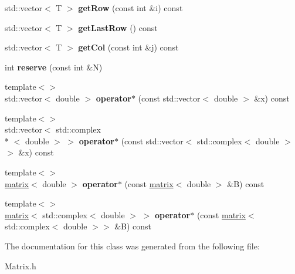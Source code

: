 \begin{DoxyCompactItemize}
\item 
\hypertarget{classkeycpp_1_1matrix_a14cad5ff7a9b3079754fc83b677208ed}{std\-::vector$<$ T $>$ {\bfseries get\-Row} (const int \&i) const }\label{classkeycpp_1_1matrix_a14cad5ff7a9b3079754fc83b677208ed}

\item 
\hypertarget{classkeycpp_1_1matrix_a20002e97217bcc6382e60694bf898e1f}{std\-::vector$<$ T $>$ {\bfseries get\-Last\-Row} () const }\label{classkeycpp_1_1matrix_a20002e97217bcc6382e60694bf898e1f}

\item 
\hypertarget{classkeycpp_1_1matrix_a9c16ead5c2a61eb35c33328caa235b2f}{std\-::vector$<$ T $>$ {\bfseries get\-Col} (const int \&j) const }\label{classkeycpp_1_1matrix_a9c16ead5c2a61eb35c33328caa235b2f}

\item 
\hypertarget{classkeycpp_1_1matrix_a719eb1cb62d0cd9168abe2235235f278}{int {\bfseries reserve} (const int \&N)}\label{classkeycpp_1_1matrix_a719eb1cb62d0cd9168abe2235235f278}

\item 
\hypertarget{classkeycpp_1_1matrix_a53aaf4f54bdbebf5664b67a440f73040}{{\footnotesize template$<$$>$ }\\std\-::vector$<$ double $>$ {\bfseries operator$\ast$} (const std\-::vector$<$ double $>$ \&x) const}\label{classkeycpp_1_1matrix_a53aaf4f54bdbebf5664b67a440f73040}

\item 
\hypertarget{classkeycpp_1_1matrix_a8a9131597beafc39a3d94b59af930756}{{\footnotesize template$<$$>$ }\\std\-::vector$<$ std\-::complex\\*
$<$ double $>$ $>$ {\bfseries operator$\ast$} (const std\-::vector$<$ std\-::complex$<$ double $>$$>$ \&x) const}\label{classkeycpp_1_1matrix_a8a9131597beafc39a3d94b59af930756}

\item 
\hypertarget{classkeycpp_1_1matrix_a0e9fdbebdf1d95dd225a2bd1310cba30}{{\footnotesize template$<$$>$ }\\\hyperlink{classkeycpp_1_1matrix}{matrix}$<$ double $>$ {\bfseries operator$\ast$} (const \hyperlink{classkeycpp_1_1matrix}{matrix}$<$ double $>$ \&B) const}\label{classkeycpp_1_1matrix_a0e9fdbebdf1d95dd225a2bd1310cba30}

\item 
\hypertarget{classkeycpp_1_1matrix_a0cbaef09170a16f74ed5acefa0f8ad3a}{{\footnotesize template$<$$>$ }\\\hyperlink{classkeycpp_1_1matrix}{matrix}$<$ std\-::complex$<$ double $>$ $>$ {\bfseries operator$\ast$} (const \hyperlink{classkeycpp_1_1matrix}{matrix}$<$ std\-::complex$<$ double $>$$>$ \&B) const}\label{classkeycpp_1_1matrix_a0cbaef09170a16f74ed5acefa0f8ad3a}

\end{DoxyCompactItemize}


The documentation for this class was generated from the following file\-:\begin{DoxyCompactItemize}
\item 
Matrix.\-h\end{DoxyCompactItemize}
